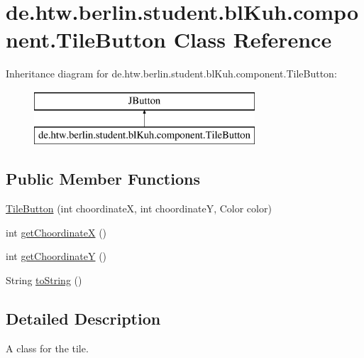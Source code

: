 \hypertarget{classde_1_1htw_1_1berlin_1_1student_1_1bl_kuh_1_1component_1_1_tile_button}{\section{de.\-htw.\-berlin.\-student.\-bl\-Kuh.\-component.\-Tile\-Button Class Reference}
\label{classde_1_1htw_1_1berlin_1_1student_1_1bl_kuh_1_1component_1_1_tile_button}
}
Inheritance diagram for de.\-htw.\-berlin.\-student.\-bl\-Kuh.\-component.\-Tile\-Button\-:\begin{figure}[H]
\begin{center}
\leavevmode
\includegraphics[height=2.000000cm]{classde_1_1htw_1_1berlin_1_1student_1_1bl_kuh_1_1component_1_1_tile_button}
\end{center}
\end{figure}
\subsection*{Public Member Functions}
\begin{DoxyCompactItemize}
\item 
\hyperlink{classde_1_1htw_1_1berlin_1_1student_1_1bl_kuh_1_1component_1_1_tile_button_ab02c4c2ca599f6f4d08aa8a57c351a71}{Tile\-Button} (int choordinate\-X, int choordinate\-Y, Color color)
\item 
int \hyperlink{classde_1_1htw_1_1berlin_1_1student_1_1bl_kuh_1_1component_1_1_tile_button_a32580865b121cbc59472ae5e2b0348a6}{get\-Choordinate\-X} ()
\item 
int \hyperlink{classde_1_1htw_1_1berlin_1_1student_1_1bl_kuh_1_1component_1_1_tile_button_a287a0da19012b7900abee3b6ade5333d}{get\-Choordinate\-Y} ()
\item 
String \hyperlink{classde_1_1htw_1_1berlin_1_1student_1_1bl_kuh_1_1component_1_1_tile_button_aa10ff18fab436932ecca9aa42c141776}{to\-String} ()
\end{DoxyCompactItemize}


\subsection{Detailed Description}
A class for the tile.

